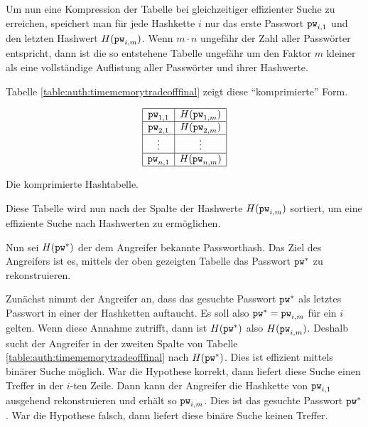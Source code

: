 Um nun eine Kompression der Tabelle bei gleichzeitiger effizienter Suche
zu erreichen, speichert man für jede Hashkette $i$ nur das erste
Passwort $\texttt{pw}_{i,1}$ und den letzten Hashwert $H(\texttt{pw}_{i,m})$. Wenn $m
\cdot n$ ungefähr der Zahl aller Passwörter entspricht, dann ist die so
entstehene Tabelle ungefähr um den Faktor $m$ kleiner als eine
vollständige Auflistung aller Passwörter und ihrer Hashwerte.

Tabelle \ref{table:auth:timememorytradeofffinal} zeigt diese "`komprimierte"' Form.
\begin{table}[!h]
  \begin{equation*}
    \begin{array}{|c|c|} \hline \texttt{pw}_{1,1} & H(\texttt{pw}_{1,m})\\
      \hline \texttt{pw}_{2,1} & H(\texttt{pw}_{2,m})\\
      \hline
      \vdots & \vdots \\
      \hline
      \texttt{pw}_{n,1} & H(\texttt{pw}_{n,m})\\
      \hline
    \end{array}
  \end{equation*}
  \caption{Die komprimierte Hashtabelle.}
  \label{table:auth:timememorytradeofffinal}
\end{table}

Diese Tabelle wird nun nach der Spalte der Hashwerte $H(\texttt{pw}_{i,m})$
sortiert, um eine effiziente Suche nach Hashwerten zu ermöglichen.

Nun sei $H(\texttt{pw}^*)$ der dem Angreifer bekannte Passworthash. Das Ziel des
Angreifers ist es, mittels der oben gezeigten Tabelle das Passwort
$\texttt{pw}^*$ zu rekonstruieren.

Zunächst nimmt der Angreifer an, dass das gesuchte Passwort $\texttt{pw}^*$ als
letztes Passwort in einer der Hashketten auftaucht.  Es soll also $\texttt{pw}^*
= \texttt{pw}_{i,m}$ für ein $i$ gelten.  Wenn diese Annahme zutrifft, dann ist
$H(\texttt{pw}^*)$ also $H(\texttt{pw}_{i,m})$. Deshalb sucht der Angreifer in der
zweiten Spalte von Tabelle \ref{table:auth:timememorytradeofffinal} nach
$H(\texttt{pw}^*)$. Dies ist effizient mittels binärer Suche möglich.  War die
Hypothese korrekt, dann liefert diese Suche einen Treffer in der $i$-ten
Zeile. Dann kann der Angreifer die Hashkette von $\texttt{pw}_{i,1}$ ausgehend
rekonstruieren und erhält so $\texttt{pw}_{i,m}$. Dies ist das gesuchte Passwort
$\texttt{pw}^*$. War die Hypothese falsch, dann liefert diese binäre Suche
keinen Treffer.

